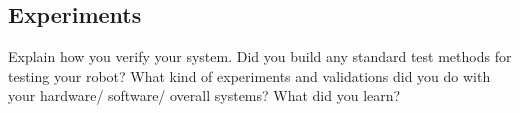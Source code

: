 \subsection{Experiments}
Explain how you verify your system. Did you build any standard test methods for testing your robot? What kind of experiments and validations did you do with your hardware/ software/ overall systems? What did you learn?